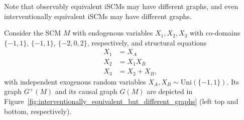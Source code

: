 Note that observably equivalent iSCMs may have different graphs, and even interventionally equivalent iSCMs may have different graphs. %
\begin{Eg}\label{eg:interventionally_equivalent_but_different_graphs}
Consider the SCM $M$ with endogenous variables $X_1,X_2,X_3$ with co-domains $\{-1,1\}$, $\{-1,1\}$, $\{-2,0,2\}$, respectively, and structural equations
$$
  \begin{aligned} 
    X_1 &= X_A \\
    X_2 &= X_1 X_B \\
    X_3 &= X_2 + X_B,
  \end{aligned} 
$$
with independent exogenous random variables $X_A,X_B \sim \mathrm{Uni}(\{-1,1\})$.
Its graph $G^+(M)$ and its causal graph $G(M)$ are depicted in Figure~\ref{fig:interventionally_equivalent_but_different_graphs} (left top and bottom, respectively).


\end{Eg}
